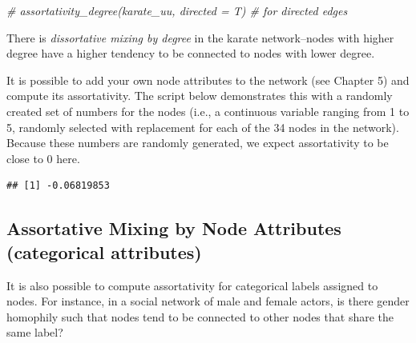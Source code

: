 \documentclass[
]{book}
\newenvironment{Shaded}{\begin{snugshade}}{\end{snugshade}}
\newcommand{\AttributeTok}[1]{\textcolor[rgb]{0.13,0.29,0.53}{#1}}
\newcommand{\CommentTok}[1]{\textcolor[rgb]{0.56,0.35,0.01}{\textit{#1}}}
\newcommand{\DecValTok}[1]{\textcolor[rgb]{0.00,0.00,0.81}{#1}}
\newcommand{\FunctionTok}[1]{\textcolor[rgb]{0.13,0.29,0.53}{\textbf{#1}}}
\newcommand{\NormalTok}[1]{#1}
\newcommand{\OtherTok}[1]{\textcolor[rgb]{0.56,0.35,0.01}{#1}}
\newcommand{\SpecialCharTok}[1]{\textcolor[rgb]{0.81,0.36,0.00}{\textbf{#1}}}
\begin{document}
\begin{Shaded}
\begin{Highlighting}[]
\CommentTok{\# assortativity\_degree(karate\_uu, directed = T) \# for directed edges }
\end{Highlighting}
\end{Shaded}

There is \emph{dissortative mixing by degree} in the karate network--nodes with higher degree have a higher tendency to be connected to nodes with lower degree.

It is possible to add your own node attributes to the network (see Chapter 5) and compute its assortativity. The script below demonstrates this with a randomly created set of numbers for the nodes (i.e., a continuous variable ranging from 1 to 5, randomly selected with replacement for each of the 34 nodes in the network). Because these numbers are randomly generated, we expect assortativity to be close to 0 here.

\begin{Shaded}
\end{Shaded}

\begin{verbatim}
## [1] -0.06819853
\end{verbatim}

\subsection{Assortative Mixing by Node Attributes (categorical attributes)}\label{assortative-mixing-by-node-attributes-categorical-attributes}

It is also possible to compute assortativity for categorical labels assigned to nodes. For instance, in a social network of male and female actors, is there gender homophily such that nodes tend to be connected to other nodes that share the same label?
\end{document}
